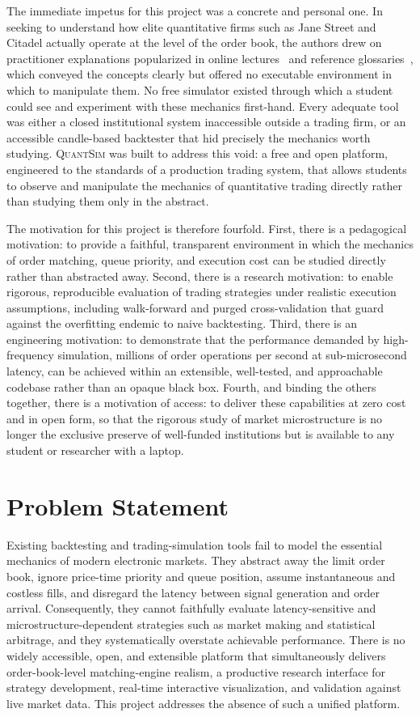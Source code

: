 \documentclass[12pt,oneside,a4paper]{report}
\newcommand{\quantsim}{\textsc{QuantSim}}
\begin{document}
The immediate impetus for this project was a concrete and personal one. In seeking to understand how elite quantitative firms such as Jane Street and Citadel actually operate at the level of the order book, the authors drew on practitioner explanations popularized in online lectures~\cite{codingjesus} and reference glossaries~\cite{investopedia}, which conveyed the concepts clearly but offered no executable environment in which to manipulate them. No free simulator existed through which a student could see and experiment with these mechanics first-hand. Every adequate tool was either a closed institutional system inaccessible outside a trading firm, or an accessible candle-based backtester that hid precisely the mechanics worth studying. \quantsim{} was built to address this void: a free and open platform, engineered to the standards of a production trading system, that allows students to observe and manipulate the mechanics of quantitative trading directly rather than studying them only in the abstract.

The motivation for this project is therefore fourfold. First, there is a pedagogical motivation: to provide a faithful, transparent environment in which the mechanics of order matching, queue priority, and execution cost can be studied directly rather than abstracted away. Second, there is a research motivation: to enable rigorous, reproducible evaluation of trading strategies under realistic execution assumptions, including walk-forward and purged cross-validation that guard against the overfitting endemic to naive backtesting. Third, there is an engineering motivation: to demonstrate that the performance demanded by high-frequency simulation, millions of order operations per second at sub-microsecond latency, can be achieved within an extensible, well-tested, and approachable codebase rather than an opaque black box. Fourth, and binding the others together, there is a motivation of access: to deliver these capabilities at zero cost and in open form, so that the rigorous study of market microstructure is no longer the exclusive preserve of well-funded institutions but is available to any student or researcher with a laptop.

\section{Problem Statement}
\label{sec:problem}

Existing backtesting and trading-simulation tools fail to model the essential mechanics of modern electronic markets. They abstract away the limit order book, ignore price-time priority and queue position, assume instantaneous and costless fills, and disregard the latency between signal generation and order arrival. Consequently, they cannot faithfully evaluate latency-sensitive and microstructure-dependent strategies such as market making and statistical arbitrage, and they systematically overstate achievable performance. There is no widely accessible, open, and extensible platform that simultaneously delivers order-book-level matching-engine realism, a productive research interface for strategy development, real-time interactive visualization, and validation against live market data. This project addresses the absence of such a unified platform.
\end{document}

